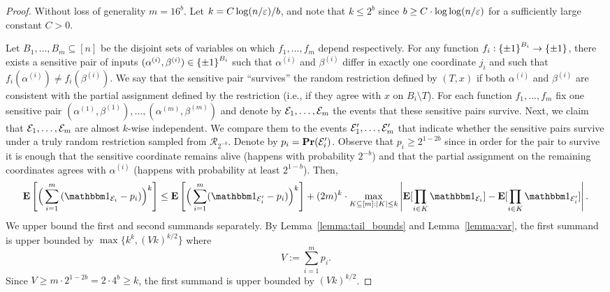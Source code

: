 \begin{proof}
Without loss of generality $m = 16^b$.
Let $k = C \log(n/\varepsilon)/b$, and note that $k \le 2^b$ since $b\ge C \cdot \log \log(n/\varepsilon)$ for a sufficiently large constant $C>0$.

Let $B_1, \ldots, B_m\subseteq [n]$ be the disjoint sets of variables on which $f_1, \ldots, f_m$ depend respectively.
For any function $f_i: {\{\pm1\}}^{B_i} \to {\{\pm1\}}$, there exists a sensitive pair of inputs $(\alpha^{(i)},\beta^{(i)}) \in {\{\pm1\}}^{B_i}$ such that $\alpha^{(i)}$ and $\beta^{(i)}$ differ in exactly one coordinate $j_i$ and such that $f_i(\alpha^{(i)}) \neq f_i(\beta^{(i)})$.
We say that the sensitive pair ``survives'' the random restriction defined by $(T,x)$ if both $\alpha^{(i)}$ and $\beta^{(i)}$ are consistent with the partial assignment defined by the restriction (i.e., if they agree with $x$ on $B_i \setminus T$).
For each function $f_1,\ldots, f_m$ fix one sensitive pair $(\alpha^{(1)}, \beta^{(1)}), \ldots, (\alpha^{(m)}, \beta^{(m)})$ and denote by $\mathcal{E}_1, \ldots, \mathcal{E}_m$ the events that these sensitive pairs survive.
Next, we claim that $\mathcal{E}_1, \ldots, \mathcal{E}_m$ are almost $k$-wise independent.
We compare them to the events $\mathcal{E}'_1, \ldots, \mathcal{E}'_m$ that indicate whether the sensitive pairs survive under a truly random restriction sampled from $\mathcal{R}_{2^{-b}}$.
Denote by $p_i = \mathop{\bf Pr\/}(\mathcal{E}'_i)$.
Observe that $p_i \ge 2^{1-2b}$ since in order for the pair to survive it is enough that the sensitive coordinate remains alive (happens with probability $2^{-b}$) and that the partial assignment on the remaining coordinates agrees with $\alpha^{(i)}$ (happens with probability at least $2^{1-b}$). %
Then,
	$$
	\E\left[\Big(\sum_{i=1}^{m}{(\one_{\cE_i}-p_i)}\Big)^k\right] \le 
		\E\left[\Big(\sum_{i=1}^{m}(\one_{\cE'_i}-p_i)\Big)^k\right] + (2m)^k \cdot \max_{K\subseteq [m]: |K|\le k} \left|\E[\prod_{i\in K} \one_{\cE_i}] - \E[\prod_{i\in K} \one_{\cE'_i}]\right|.$$ 
	We upper bound the first and second summands separately. 
	By Lemma~\ref{lemma:tail_bounds} and Lemma~\ref{lemma:var}, the first summand is upper bounded by $\max\{k^k, (Vk)^{k/2}\}$ where 
	$$
	V := \sum_{i=1}^{m}{p_i}.
	$$ 
	Since $V \ge m\cdot 2^{1-2b} = 2\cdot 4^b  \ge k$, the first summand is upper bounded by $(Vk)^{k/2}$.
		

\end{proof}

